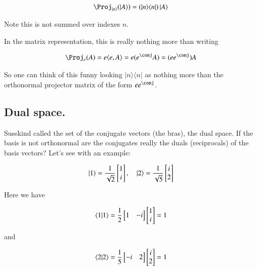 \documentclass{article}
\newcommand{\ket}[1]{\lvert {#1} \rangle}
\newcommand{\bra}[1]{\langle {#1} \rvert}
\newcommand{\braket}[2]{\langle{#1} \vert {#2}\rangle}
\newcommand{\ketbra}[2]{\ket{#1}\bra{#2}}
\begin{document}
\begin{align*}
\Proj_{\ket{n}}(\ket{A}) = \left( \ketbra{n}{n} \right) \ket{A}
\end{align*}

Note this is not summed over indexes $n$.

In the matrix representation, this is really nothing more than writing

\begin{align*}
\Proj_{e} (A) = e \innerprod{e}{A} = e (e^\conj A) = (e e^\conj) A
\end{align*}

So one can think of this funny looking $\ketbra{n}{n}$ as nothing more than the orthonormal projector matrix of the form $e e^\conj$.

\subsection{ Dual space. }

Susskind called the set of the conjugate vectors (the bras), the dual space.  If the basis is not orthonormal
are the conjugates really the duals (reciprocals) of the basis vectors?  Let's see with an example:

\begin{align*}
\ket{1} = 
\inv{\sqrt{2}}
\begin{bmatrix}
1 \\
i
\end{bmatrix}
, \quad
\ket{2} = 
\inv{\sqrt{5}}
\begin{bmatrix}
i \\
2
\end{bmatrix}
\end{align*}

Here we have

\begin{align*}
\braket{1}{1} = 
\inv{2}
\begin{bmatrix}
1 & -i
\end{bmatrix}
\begin{bmatrix}
1 \\
i
\end{bmatrix}
= 1
\end{align*}

and 

\begin{align*}
\braket{2}{2} = 
\inv{5}
\begin{bmatrix}
-i & 2 
\end{bmatrix}
\begin{bmatrix}
i \\
2
\end{bmatrix}
= 1
\end{align*}
\end{document}
